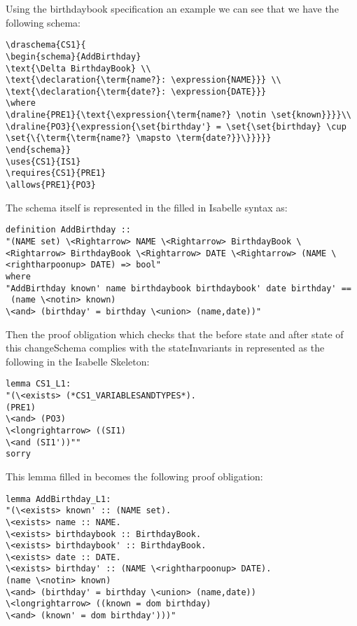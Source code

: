 Using the birthdaybook specification an example we can see that we have the
following schema:

\begin{verbatim}
\draschema{CS1}{
\begin{schema}{AddBirthday}
\text{\Delta BirthdayBook} \\
\text{\declaration{\term{name?}: \expression{NAME}}} \\
\text{\declaration{\term{date?}: \expression{DATE}}}
\where
\draline{PRE1}{\text{\expression{\term{name?} \notin \set{known}}}}\\
\draline{PO3}{\expression{\set{birthday'} = \set{\set{birthday} \cup \set{\{\term{\term{name?} \mapsto \term{date?}}\}}}}}
\end{schema}}
\uses{CS1}{IS1}
\requires{CS1}{PRE1}
\allows{PRE1}{PO3}
\end{verbatim}

The schema itself is represented in the filled in Isabelle syntax as:

\begin{verbatim}
definition AddBirthday :: 
"(NAME set) \<Rightarrow> NAME \<Rightarrow> BirthdayBook \<Rightarrow> BirthdayBook \<Rightarrow> DATE \<Rightarrow> (NAME \<rightharpoonup> DATE) => bool"
where 
"AddBirthday known' name birthdaybook birthdaybook' date birthday' ==
 (name \<notin> known)
\<and> (birthday' = birthday \<union> (name,date))"
\end{verbatim}

Then the proof obligation which checks that the before state and after state of
this changeSchema complies with the stateInvariants in represented as the
following in the Isabelle Skeleton:

\begin{verbatim}
lemma CS1_L1:
"(\<exists> (*CS1_VARIABLESANDTYPES*).
(PRE1)
\<and> (PO3)
\<longrightarrow> ((SI1)
\<and (SI1'))""
sorry
\end{verbatim}

This lemma filled in becomes the following proof obligation:

\begin{verbatim}
lemma AddBirthday_L1:
"(\<exists> known' :: (NAME set).
\<exists> name :: NAME.
\<exists> birthdaybook :: BirthdayBook.
\<exists> birthdaybook' :: BirthdayBook.
\<exists> date :: DATE.
\<exists> birthday' :: (NAME \<rightharpoonup> DATE).
(name \<notin> known)
\<and> (birthday' = birthday \<union> (name,date))
\<longrightarrow> ((known = dom birthday)
\<and> (known' = dom birthday')))"
\end{verbatim}


